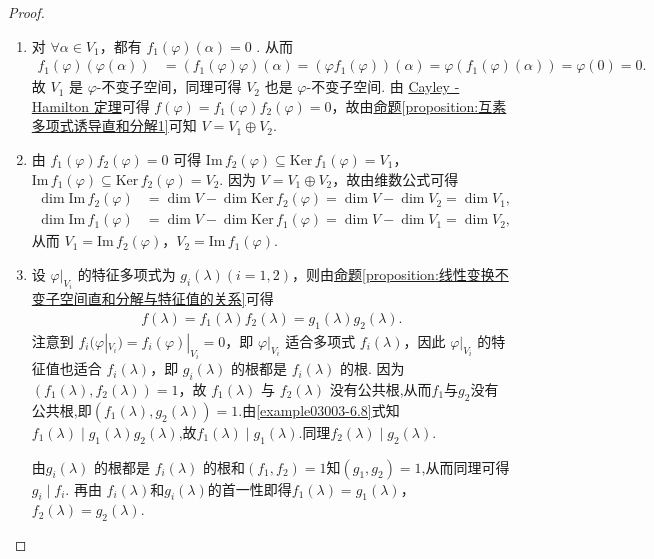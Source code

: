 \documentclass[../../main.tex]{subfiles}%
\begin{document}
\begin{proof}
\begin{enumerate}[(1)]
\item  对 $\forall \alpha\in V_1$，都有 $f_1(\varphi)(\alpha)=0$ . 从而
\begin{align*}
f_1(\varphi)(\varphi(\alpha))&=(f_1(\varphi)\varphi)(\alpha)=(\varphi f_1(\varphi))(\alpha)=\varphi(f_1(\varphi)(\alpha))=\varphi(0)=0.
\end{align*}
故 $V_1$ 是 $\varphi$-不变子空间，同理可得 $V_2$ 也是 $\varphi$-不变子空间. 
由 \hyperref[theorem:Cayley-Hamilton定理]{Cayley - Hamilton 定理}可得 $f(\varphi)=f_1(\varphi)f_2(\varphi)=0$，故由\hyperref[proposition:互素多项式诱导直和分解1]{命题\ref{proposition:互素多项式诱导直和分解1}}可知 $V = V_1\oplus V_2$.

\item 由 $f_1(\varphi)f_2(\varphi)=0$ 可得 $\mathrm{Im}\,f_2(\varphi)\subseteq\mathrm{Ker}\,f_1(\varphi)=V_1$，$\mathrm{Im}\,f_1(\varphi)\subseteq\mathrm{Ker}\,f_2(\varphi)=V_2$. 因为 $V = V_1\oplus V_2$，故由维数公式可得
\begin{align*}
\dim\mathrm{Im}\,f_2(\varphi)&=\dim V - \dim\mathrm{Ker}\,f_2(\varphi)=\dim V - \dim V_2=\dim V_1,\\
\dim\mathrm{Im}\,f_1(\varphi)&=\dim V - \dim\mathrm{Ker}\,f_1(\varphi)=\dim V - \dim V_1=\dim V_2,
\end{align*}
从而 $V_1 = \mathrm{Im}\,f_2(\varphi)$，$V_2 = \mathrm{Im}\,f_1(\varphi)$.

\item 设 $\varphi|_{V_i}$ 的特征多项式为 $g_i(\lambda) (i = 1,2)$，则由\hyperref[proposition:线性变换不变子空间直和分解与特征值的关系]{命题\ref{proposition:线性变换不变子空间直和分解与特征值的关系}}可得
\begin{align}
f(\lambda)=f_1(\lambda)f_2(\lambda)=g_1(\lambda)g_2(\lambda). \label{example03003-6.8}
\end{align}
注意到 $f_i(\varphi|_{V_i})=f_i(\varphi)|_{V_i}=0$，即 $\varphi|_{V_i}$ 适合多项式 $f_i(\lambda)$，因此 $\varphi|_{V_i}$ 的特征值也适合 $f_i(\lambda)$，即 $g_i(\lambda)$ 的根都是 $f_i(\lambda)$ 的根. 因为 $(f_1(\lambda),f_2(\lambda)) = 1$，故 $f_1(\lambda)$ 与 $f_2(\lambda)$ 没有公共根,从而$f_1$与$g_2$没有公共根,即$(f_1(\lambda),g_2(\lambda))=1.$由\eqref{example03003-6.8}式知$f_1(\lambda)\mid g_1(\lambda)g_2(\lambda)$,故$f_1(\lambda)\mid g_1(\lambda).$同理$f_2(\lambda)\mid g_2(\lambda).$

由$g_i(\lambda)$ 的根都是 $f_i(\lambda)$ 的根和$(f_1,f_2)=1$知$(g_1,g_2)=1$,从而同理可得$g_i\mid f_i$.
再由 $f_i(\lambda)$和$g_i(\lambda)$的首一性即得$f_1(\lambda)=g_1(\lambda)$，$f_2(\lambda)=g_2(\lambda)$. 
\end{enumerate}
\end{proof}
\end{document}
